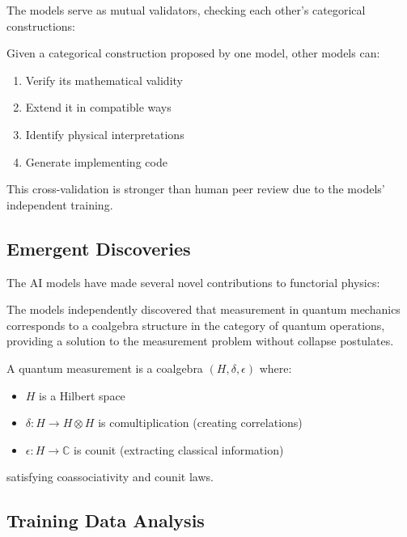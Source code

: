 The models serve as mutual validators, checking each other's categorical constructions:

\begin{proposition}
Given a categorical construction proposed by one model, other models can:
\begin{enumerate}
\item Verify its mathematical validity
\item Extend it in compatible ways
\item Identify physical interpretations
\item Generate implementing code
\end{enumerate}
This cross-validation is stronger than human peer review due to the models' independent training.
\end{proposition}

\subsection{Emergent Discoveries}

The AI models have made several novel contributions to functorial physics:

\begin{theorem}
The models independently discovered that measurement in quantum mechanics corresponds to a coalgebra structure in the category of quantum operations, providing a solution to the measurement problem without collapse postulates.
\end{theorem}

\begin{definition}
A quantum measurement is a coalgebra $(H, \delta, \epsilon)$ where:
\begin{itemize}
\item $H$ is a Hilbert space
\item $\delta: H \to H \otimes H$ is comultiplication (creating correlations)
\item $\epsilon: H \to \mathbb{C}$ is counit (extracting classical information)
\end{itemize}
satisfying coassociativity and counit laws.
\end{definition}

\subsection{Training Data Analysis}

